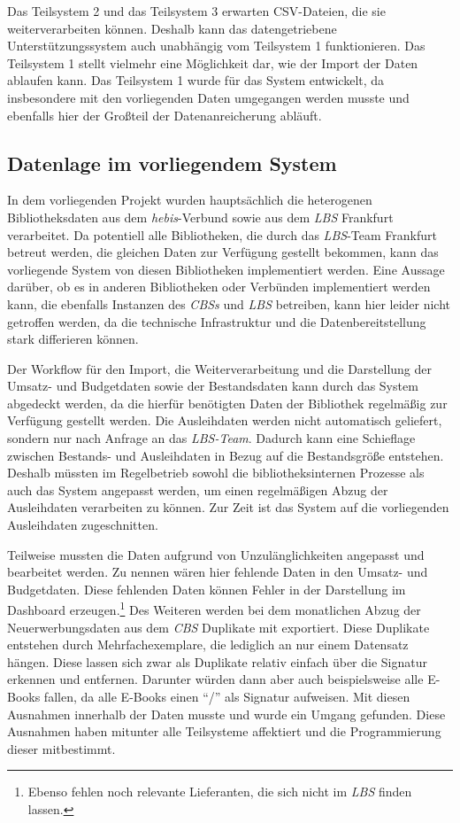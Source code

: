Das Teilsystem 2 und das Teilsystem 3 erwarten CSV-Dateien, die sie weiterverarbeiten können. 
Deshalb kann das datengetriebene Unterstützungssystem auch unabhängig vom Teilsystem 1 funktionieren. 
Das Teilsystem 1 stellt vielmehr eine Möglichkeit dar, wie der Import der Daten ablaufen kann. 
Das Teilsystem 1 wurde für das System entwickelt, da insbesondere mit den vorliegenden Daten umgegangen werden musste und ebenfalls hier 
der Großteil der Datenanreicherung abläuft.


\subsection{Datenlage im vorliegendem System}
In dem vorliegenden Projekt wurden hauptsächlich die heterogenen Bibliotheksdaten aus dem \textit{\acrshort{hebis}}-Verbund sowie aus dem \textit{\acrlong{LBS}} Frankfurt verarbeitet.
Da potentiell alle Bibliotheken, die durch das \textit{\acrshort{LBS}}-Team Frankfurt betreut werden, die gleichen Daten zur Verfügung gestellt bekommen,
kann das vorliegende  System von diesen Bibliotheken implementiert werden. Eine Aussage darüber, ob es in anderen Bibliotheken oder Verbünden implementiert werden kann, die ebenfalls
Instanzen des \textit{\acrlong{CBS}s} und \textit{\acrshort{LBS}} betreiben, kann hier leider nicht getroffen werden, da die technische Infrastruktur
und die Datenbereitstellung stark differieren können. 

Der Workflow für den Import, die Weiterverarbeitung und die Darstellung der Umsatz- und Budgetdaten sowie der Bestandsdaten kann durch das System
abgedeckt werden, da die hierfür benötigten Daten der Bibliothek regelmäßig zur Verfügung gestellt werden. Die Ausleihdaten werden nicht automatisch
geliefert, sondern nur nach Anfrage an das \textit{\acrshort{LBS}-Team}. Dadurch kann eine Schieflage zwischen Bestands- und Ausleihdaten in Bezug auf die Bestandsgröße entstehen.
Deshalb müssten im Regelbetrieb sowohl die bibliotheksinternen Prozesse als auch das System angepasst werden, um einen regelmäßigen Abzug der Ausleihdaten
verarbeiten zu können. Zur Zeit ist das System auf die vorliegenden Ausleihdaten zugeschnitten.

Teilweise mussten die Daten aufgrund von Unzulänglichkeiten angepasst und bearbeitet werden.
Zu nennen wären hier fehlende Daten in den Umsatz- und Budgetdaten. Diese fehlenden Daten können Fehler in der Darstellung im Dashboard erzeugen.\footnote{  Ebenso fehlen noch relevante Lieferanten, die sich nicht im \textit{\acrshort{LBS}} finden lassen.}
Des Weiteren werden bei dem monatlichen Abzug der Neuerwerbungsdaten aus dem \textit{\acrshort{CBS}} Duplikate mit exportiert. Diese Duplikate entstehen durch
Mehrfachexemplare, die lediglich an nur einem Datensatz hängen. Diese lassen sich zwar als Duplikate relativ einfach über die Signatur erkennen und entfernen.
Darunter würden dann aber auch beispielsweise alle E-Books fallen, da alle E-Books einen \enquote{/} als Signatur aufweisen. Mit diesen Ausnahmen innerhalb der Daten musste und wurde ein Umgang gefunden.
Diese Ausnahmen haben mitunter alle Teilsysteme affektiert und
die Programmierung dieser mitbestimmt.

